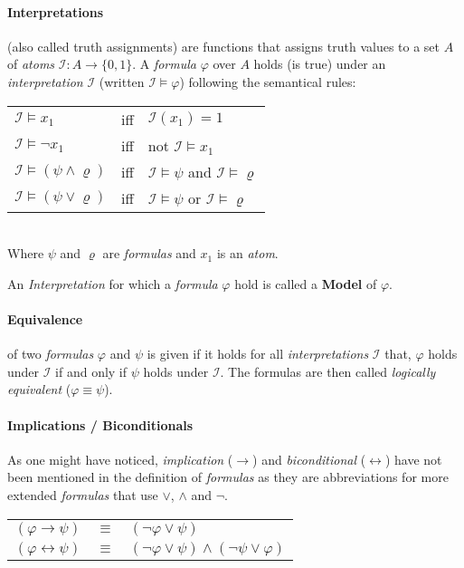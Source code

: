 \paragraph{Interpretations} (also called truth assignments) are functions that assigns truth values to a set $A$ of \emph{atoms} $\mathcal{I}: A \rightarrow \{0,1\}$. A \emph{formula} $\varphi$ over $A$ holds (is true) under an \emph{interpretation} $\mathcal{I}$ (written $\mathcal{I} \models \varphi$) following the semantical rules:
\begin{center}
    \begin{tabular}{ l l l }
    $\mathcal{I} \models x_1$ & iff & $\mathcal{I}(x_1) = 1$\\
    $\mathcal{I} \models \neg x_1$ & iff & not $\mathcal{I} \models x_1$\\
    $\mathcal{I} \models (\psi \land \varrho)$ & iff & $\mathcal{I} \models \psi$ and $\mathcal{I} \models \varrho$\\
    $\mathcal{I} \models (\psi \lor \varrho)$ & iff & $\mathcal{I} \models \psi$ or $\mathcal{I} \models \varrho$\\
\end{tabular}\\
Where $\psi$ and  $\varrho$ are \emph{formulas} and $x_1$ is an \emph{atom}.
\end{center}

An \emph{Interpretation} for which a \emph{formula} $\varphi$ hold is called a \textbf{Model} of $\varphi$.

\paragraph{Equivalence}
of two \emph{formulas} $\varphi$ and $\psi$ is given if it holds for all \emph{interpretations} $\mathcal{I}$ that, $\varphi$ holds under $\mathcal{I}$ if and only if $\psi$ holds under $\mathcal{I}$. The formulas are then called \emph {logically equivalent} ($\varphi \equiv \psi$).

\paragraph{Implications / Biconditionals}
As one might have noticed, \emph{implication} ($\rightarrow$) and \emph{biconditional} ($\leftrightarrow$) have not been mentioned in the definition of \emph{formulas} as they are abbreviations for more extended \emph{formulas} that use $\lor$, $\land$ and $\neg$.
\begin{center}
\begin{tabular}{ l l l }
    $(\varphi \rightarrow \psi)$ & $\equiv$ & $(\neg\varphi \lor \psi)$\\
    $(\varphi \leftrightarrow \psi)$ & $\equiv$ & $(\neg\varphi \lor \psi) \land (\neg\psi \lor \varphi)$\\
\end{tabular}
\end{center}

